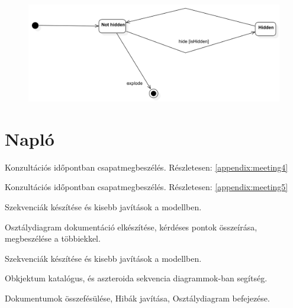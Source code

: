 \documentclass[../../projlab]{subfiles}
\begin{document}
\begin{figure}[H]
	\includegraphics[width=1\textwidth]{docs/2_Project/svg/Design Model!Spaceship Hide!Spaceship Hide_5.png}
	\centering
\end{figure}

\section{Napló}

\begin{naplo}
	{ 
		Konzultációs időpontban csapatmegbeszélés.
        Részletesen: \ref{appendix:meeting4}
	}

	{ 
		Konzultációs időpontban csapatmegbeszélés.
        Részletesen: \ref{appendix:meeting5}
	}
	{ 
		Szekvenciák készítése és kisebb javítások a modellben.
        
	}
	{ 
		Osztálydiagram dokumentáció elkészítése, kérdéses pontok összeírása, megbeszélése a többiekkel.
        
	}
	{ 
		Szekvenciák készítése és kisebb javítások a modellben.
        
	}
	{ 
		Obkjektum katalógus, és aszteroida sekvencia diagrammok-ban segítség.   
	}

	{ 
		Dokumentumok összefésülése, Hibák javítása, Osztálydiagram befejezése.   
	}

\end{naplo}

\begin{toappendix}


	
\end{toappendix}
\end{document}
